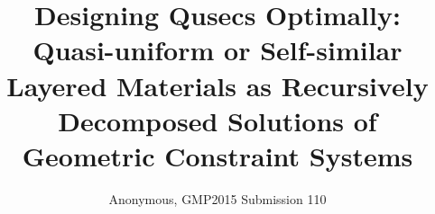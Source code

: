 \documentclass[3p]{elsarticle}
\begin{document}
\begin{frontmatter}
%
%
\title{Designing Qusecs Optimally:
Quasi-uniform or Self-similar Layered Materials as
Recursively Decomposed Solutions of Geometric Constraint
Systems}

%
%

%
%


\author{Anonymous, GMP2015 Submission 110}

%
%











%
%



\end{frontmatter}
\end{document}
